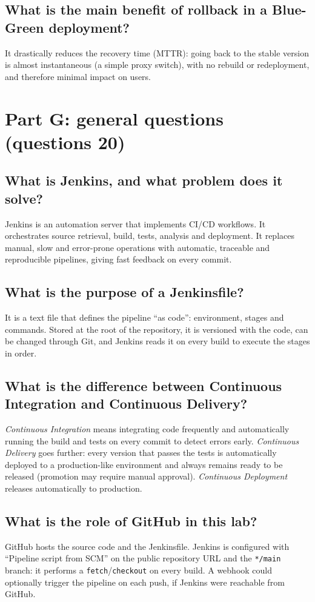 \documentclass[11pt,a4paper]{article}
\begin{document}
\subsection{What is the main benefit of rollback in a Blue-Green deployment?}
It drastically reduces the recovery time (MTTR): going back to the stable version is almost
instantaneous (a simple proxy switch), with no rebuild or redeployment, and therefore
minimal impact on users.

\section{Part G: general questions (questions 20)}

\subsection{What is Jenkins, and what problem does it solve?}
Jenkins is an automation server that implements CI/CD workflows. It orchestrates source
retrieval, build, tests, analysis and deployment. It replaces manual, slow and
error-prone operations with automatic, traceable and reproducible pipelines, giving fast
feedback on every commit.

\subsection{What is the purpose of a Jenkinsfile?}
It is a text file that defines the pipeline ``as code'': environment, stages and commands.
Stored at the root of the repository, it is versioned with the code, can be changed
through Git, and Jenkins reads it on every build to execute the stages in order.

\subsection{What is the difference between Continuous Integration and Continuous Delivery?}
\emph{Continuous Integration} means integrating code frequently and automatically running
the build and tests on every commit to detect errors early. \emph{Continuous Delivery}
goes further: every version that passes the tests is automatically deployed to a
production-like environment and always remains ready to be released (promotion may require
manual approval). \emph{Continuous Deployment} releases automatically to production.

\subsection{What is the role of GitHub in this lab?}
GitHub hosts the source code and the Jenkinsfile. Jenkins is configured with ``Pipeline
script from SCM'' on the public repository URL and the \texttt{*/main} branch: it performs
a \texttt{fetch}/\texttt{checkout} on every build. A webhook could optionally trigger the
pipeline on each push, if Jenkins were reachable from GitHub.
\end{document}
